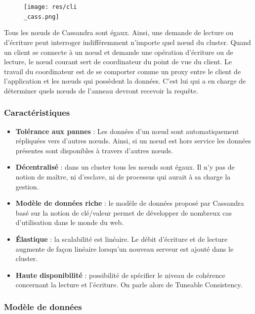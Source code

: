 \documentclass[a4paper, 11pt, titlepage]{article}
\begin{document}
\begin{figure}
\texttt{[image: res/cli\\\_cass.png]}
\end{figure}

Tous les nœuds de Cassandra sont égaux. Ainsi, une demande de lecture ou d'écriture peut interroger indifféremment n'importe quel nœud du cluster. Quand un client se connecte à un nœud et demande une opération d'écriture ou de lecture, le nœud courant sert de coordinateur du point de vue du client. Le travail du coordinateur est de se comporter comme un proxy entre le client de l'application et les nœuds qui possèdent la données. C'est lui qui a en charge de déterminer quels nœuds de l'anneau devront recevoir la requête.


\subsubsection* {Caractéristiques}


\begin{itemize}

\item
\textbf{Tolérance aux pannes} : Les données d'un nœud sont automatiquement répliquées vers d'autres nœuds. Ainsi, si un nœud est hors service les données présentes sont disponibles à travers d'autres nœuds.

\item
\textbf{Décentralisé} : dans un cluster tous les nœuds sont égaux. Il n'y pas de notion de maître, ni d'esclave, ni de processus qui aurait à sa charge la gestion.

\item
\textbf{Modèle de données riche} : le modèle de données proposé par Cassandra basé sur la notion de clé/valeur permet de développer de nombreux cas d'utilisation dans le monde du web.

\item
\textbf{Élastique} : la scalabilité est linéaire. Le débit d'écriture et de lecture augmente de façon linéaire lorsqu'un nouveau serveur est ajouté dans le cluster.

\item
\textbf{Haute disponibilité} : possibilité de spécifier le niveau de cohérence concernant la lecture et l'écriture. On parle alors de Tuneable Consistency.

\end{itemize}

\subsubsection* {Modèle de données}
\end{document}
